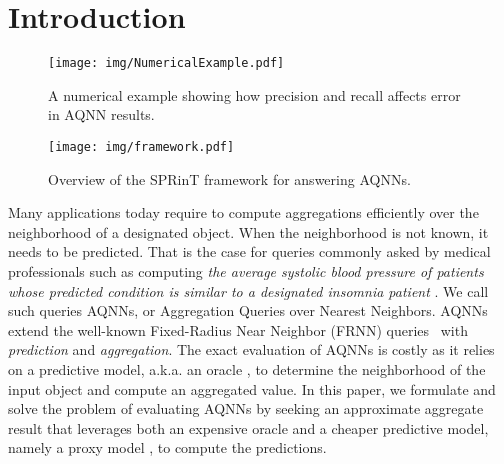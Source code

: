 \section{Introduction}\label{sec:intro}

\begin{figure}[t!]
    \centering \texttt{[image: img/NumericalExample.pdf]}
    \caption{A numerical example showing how precision and recall affects error in AQNN results.}
    \label{numericalExample}
\end{figure}


\begin{figure*}[t!]
    \centering \texttt{[image: img/framework.pdf]}
    \caption{Overview of the SPRinT framework for answering AQNNs.}
    \label{fig:framework}
\end{figure*}

Many applications today require to compute aggregations efficiently over the neighborhood of a designated object. When the neighborhood is not known, it needs to be predicted. That is the case for queries commonly asked by medical professionals such as computing {\em the average systolic blood pressure of patients whose predicted condition is similar to a designated insomnia patient} \cite{DBLP:journals/isci/RodriguesGSBA21}. We call such queries AQNNs, or Aggregation Queries over Nearest Neighbors. AQNNs extend the well-known Fixed-Radius Near Neighbor (FRNN) queries~\cite{FRNNSurvey} with {\em prediction} and {\em aggregation}. The exact evaluation of AQNNs is costly as it relies on a predictive model, a.k.a. an oracle \cite{DBLP:conf/sigmod/LaiHLZ0K21, DBLP:journals/pvldb/KangGBHZ20, DujianPQA}, to determine the neighborhood of the input object and compute an aggregated value. In this paper, we formulate and solve the problem of evaluating AQNNs by seeking an approximate aggregate result that leverages both an expensive oracle and a cheaper predictive model, namely a proxy model \cite{DBLP:conf/icde/AndersonCRW19, DBLP:conf/sigmod/LuCKC18, DujianPQA, kang2017noscope}, to compute the predictions. \\

